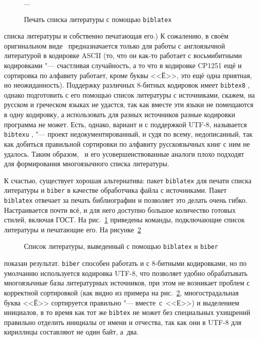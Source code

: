 \documentclass[a4paper,12pt,hyphens]{article}
\newcommand\package[1]{\texttt{#1}}
\newcommand\exe[1]{\texttt{#1}}
\begin{document}
\begin{figure}[tp]
\begin{latexcode}
\usepackage[style=gost-numeric]{biblatex}


...

\printbibliography
\end{latexcode}
\caption{Печать списка литературы с помощью \package{biblatex}}\label{biblatex1}
\end{figure}
списка литературы и собственно печатающая его.)
К сожалению, в своём оригинальном виде \BibTeX\ предназначается только
для работы с англоязычной литературой в кодировке ASCII (то, что
он как-то работает с восьмибитными кодировками "--- счастливая случайность,
а то что в кодировке CP1251 ещё и сортировка по алфавиту работает,
кроме буквы <<Ё>>, это ещё одна приятная, но неожиданность). Поддержку различных
8-битных кодировок имеет \exe{bibtex8} \parencite{ctan-bibtex8},
однако подготовить с его помощью
список литературы с источниками, скажем, на русском и греческом языках
не удастся, так как вместе эти языки не помещаются в одну кодировку, а
использовать для разных источников разные кодировки программа не может.
Есть, однако, вариант и с поддержкой UTF-8, называется
\exe{bibtexu} \parencite{ctan-bibtexu,se-bibtexu}, "--- проект
недокументированный, и судя по всему, недописанный, так как
добиться правильной сортировки по алфавиту русскоязычных книг с ним
не удалось. Таким образом, \BibTeX\ и его усовершенствованные аналоги
плохо подходят для формирования многоязычного списка литературы.

К счастью, существует хорошая альтернатива: пакет
\package{biblatex} \parencite{ctan-biblatex,se-biblatex}
для печати списка литературы и
\exe{biber} \parencite{ctan-biber}
в качестве обработчика файла с источниками.
Пакет \package{biblatex} отвечает за печать библиографии и позволяет
это делать очень гибко. Настраивается почти всё, и для него доступно большое
количество готовых стилей, включая ГОСТ. На рис.~\ref{biblatex1}
приведены
команды, подключающие список литературы и печатающие его. На рисунке~\ref{biblatex2}%
\nocite{esin1950,yolkin1997,chebyshev1859,eliseeva2010}%
%
%
\begin{figure}[tp]
\begin{tcolorbox}[colback=white,colframe=white]
\printbibliography[keyword=example,resetnumbers=1]
\end{tcolorbox}
\caption{Список литературы, выведенный с помощью \package{biblatex} и \exe{biber}}\label{biblatex2}
\end{figure}
показан результат.
\exe{biber} способен работать и с 8-битными кодировками, но по умолчанию
используется кодировка UTF-8, что позволяет удобно обрабатывать многоязычные
базы литературных источников, при этом не возникает проблем с корректной сортировкой
(как видно из примера на рис.~\ref{biblatex2}, многострадальная буква <<Ё>>
сортируется правильно "--- вместе~с~<<Е>>) и выделением инициалов, в то время как
тот же \exe{bibtex} не может без специальных ухищрений правильно отделить
инициалы от имени и отчества, так как они в UTF-8 для кириллицы составляют не
один байт, а~два.
\end{document}
